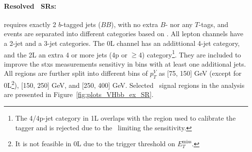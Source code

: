 \paragraph{Resolved \boldvhb\ SRs:} requires exactly 2 $b$-tagged jets ($BB$), with no extra $B$- nor any $T$-tags, and events are separated into different categories based on \nj. All lepton channels have a 2-jet and a 3-jet categories. The 0L channel has an addittional 4-jet category, and the 2L an extra 4 or more jets (4p or $\geq$4) category\footnote{The 4/4p-jet category in 1L overlaps with the region used to calibrate the tagger and is rejected due to the \ttb\ limiting the sensitivity.}. They are included to improve the \gls{stxs} measurements sensitivy in bins with at least one additional jets. All regions are further split into different bins of $p_T^V$ as [75, 150] GeV (except for 0L\footnote{It is not feasible in 0L due to the trigger threshold on $E_T^{\textrm{miss}}$.}), [150, 250] GeV, and [250, 400] GeV. Selected \vhb\ signal regions in the analysis are presented in Figure~\ref{fig:plots_VHbb_ex_SR}. %


